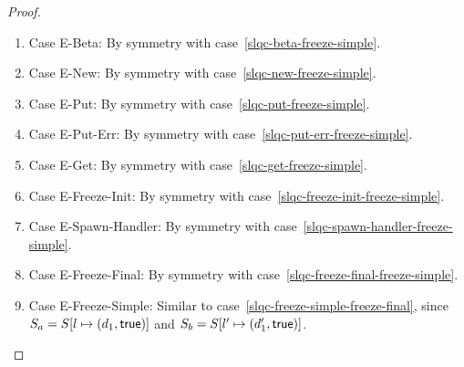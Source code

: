 \begin{proof}
\begin{enumerate}
    \begin{enumerate}
    \item \label{slqc-freeze-simple-beta}Case {\sc E-Beta}: By symmetry with case~\ref{slqc-beta-freeze-simple}.
    \item \label{slqc-freeze-simple-new}Case {\sc E-New}: By symmetry with case~\ref{slqc-new-freeze-simple}.
    \item \label{slqc-freeze-simple-put}Case {\sc E-Put}: By symmetry with case~\ref{slqc-put-freeze-simple}.
    \item \label{slqc-freeze-simple-put-err}Case {\sc E-Put-Err}: By symmetry with case~\ref{slqc-put-err-freeze-simple}.
    \item \label{slqc-freeze-simple-get}Case {\sc E-Get}: By symmetry with case~\ref{slqc-get-freeze-simple}.
    \item \label{slqc-freeze-simple-freeze-init}Case {\sc E-Freeze-Init}: By symmetry with case~\ref{slqc-freeze-init-freeze-simple}.
    \item \label{slqc-freeze-simple-spawn-handler}Case {\sc E-Spawn-Handler}: By symmetry with case~\ref{slqc-spawn-handler-freeze-simple}.
    \item \label{slqc-freeze-simple-freeze-final}Case {\sc E-Freeze-Final}: By symmetry with case~\ref{slqc-freeze-final-freeze-simple}.
    \item \label{slqc-freeze-simple-freeze-simple}Case {\sc
      E-Freeze-Simple}: Similar to
      case~\ref{slqc-freeze-simple-freeze-final}, since $S_a =
      S[l \mapsto (d_1, \textsf{true})]$ and $S_b =
      S[l' \mapsto (d'_1, \textsf{true})]$.
    \end{enumerate}

  \end{enumerate}
\end{proof}

